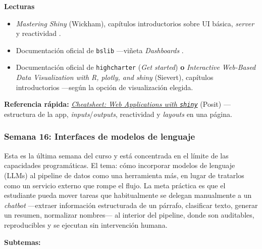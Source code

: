 \documentclass[11pt,letterpaper]{article}
\newcommand{\blue}[1]{{\color{cerulean}#1}}
\newcommand{\semana}[2]{%
  \subsubsection*{\color{main}Semana #1: #2}%
}
\newcommand{\cheatsheet}[2]{%
  \href{https://rstudio.github.io/cheatsheets/#1.pdf}{\textit{Cheatsheet: #2}}%
}
\begin{document}
\medskip
\noindent\textbf{Lecturas}
\begin{itemize}[leftmargin=*, itemsep=1pt]
    \item \textit{Mastering Shiny} (Wickham), capítulos introductorios sobre UI básica, \textit{server} y reactividad \cite{wickham2021mastering-shiny}.
    \item Documentación oficial de \texttt{bslib} ---viñeta \textit{Dashboards} \cite{bslib-docs}.
    \item Documentación oficial de \texttt{highcharter} (\textit{Get started}) \cite{kunst-highcharter} \textbf{o} \textit{Interactive Web-Based Data Visualization with R, plotly, and shiny} (Sievert), capítulos introductorios \cite{sievert-plotly} ---según la opción de visualización elegida.
\end{itemize}

\medskip
\noindent\textbf{Referencia rápida:} \cheatsheet{shiny}{Web Applications with \texttt{shiny}} (Posit) ---estructura de la app, \textit{inputs}/\textit{outputs}, reactividad y \textit{layouts} en una página.

\semana{16}{Interfaces de modelos de lenguaje}

Esta es la última semana del curso y está concentrada en el límite de las capacidades programáticas. El tema: cómo incorporar modelos de lenguaje (LLMs) al pipeline de datos como una herramienta más, en lugar de tratarlos como un servicio externo que rompe el flujo. La meta práctica es que el estudiante pueda mover tareas que habitualmente se delegan manualmente a un \textit{chatbot} ---extraer información estructurada de un párrafo, clasificar texto, generar un resumen, normalizar nombres--- al interior del pipeline, donde son \blue{auditables, reproducibles y se ejecutan sin intervención humana}.

\textbf{Subtemas:}
\end{document}
